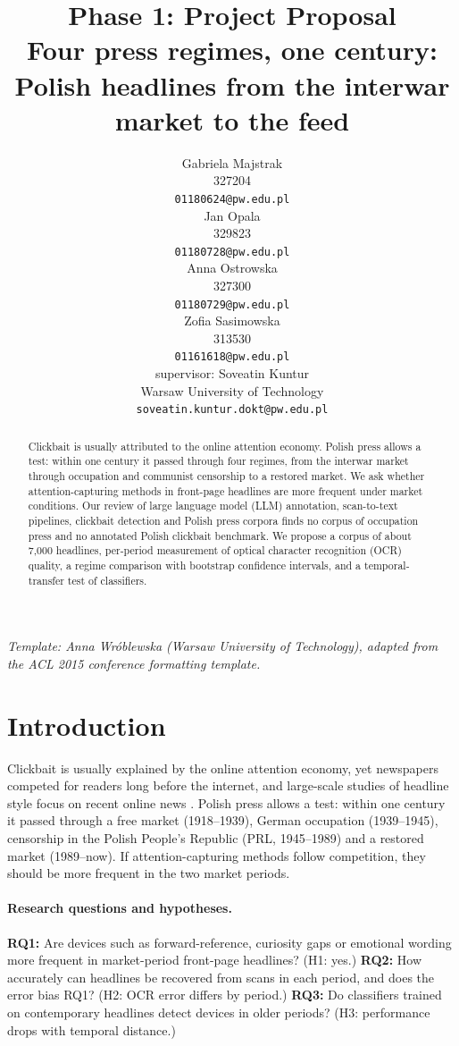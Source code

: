\documentclass[11pt]{article}
\title{Phase 1: Project Proposal\\Four press regimes, one century: Polish headlines from the interwar market to the feed}
\author{Gabriela Majstrak \\
  327204 \\
  {\tt 01180624@pw.edu.pl} \\\And
  Jan Opala \\
  329823 \\
  {\tt 01180728@pw.edu.pl} \\ \AND
  Anna Ostrowska \\
  327300 \\
  {\tt 01180729@pw.edu.pl} \\\And
  Zofia Sasimowska \\
  313530 \\
  {\tt 01161618@pw.edu.pl} \\ \AND
  supervisor: Soveatin Kuntur\\
  Warsaw University of Technology \\
  {\tt soveatin.kuntur.dokt@pw.edu.pl}}
\date{}
\begin{document}
\maketitle

{\small\em Template: Anna Wróblewska (Warsaw University of Technology), adapted from the ACL 2015 conference formatting template.}
\vspace{4pt}

\begin{abstract}
Clickbait is usually attributed to the online attention economy. Polish press allows a test: within one century it passed through four regimes, from the interwar market through occupation and communist censorship to a restored market. We ask whether attention-capturing methods in front-page headlines are more frequent under market conditions. Our review of large language model (LLM) annotation, scan-to-text pipelines, clickbait detection and Polish press corpora finds no corpus of occupation press and no annotated Polish clickbait benchmark. We propose a corpus of about 7,000 headlines, per-period measurement of optical character recognition (OCR) quality, a regime comparison with bootstrap confidence intervals, and a temporal-transfer test of classifiers.
\end{abstract}

\section{Introduction}
Clickbait is usually explained by the online attention economy, yet newspapers competed for readers long before the internet, and large-scale studies of headline style focus on recent online news \cite{nickl2025evolution,blom2015clickbait}. Polish press allows a test: within one century it passed through a free market (1918--1939), German occupation (1939--1945), censorship in the Polish People's Republic (PRL, 1945--1989) and a restored market (1989--now). If attention-capturing methods follow competition, they should be more frequent in the two market periods.

\paragraph{Research questions and hypotheses.}
\textbf{RQ1:} Are devices such as forward-reference, curiosity gaps or emotional wording more frequent in market-period front-page headlines? (H1: yes.)
\textbf{RQ2:} How accurately can headlines be recovered from scans in each period, and does the error bias RQ1? (H2: OCR error differs by period.)
\textbf{RQ3:} Do classifiers trained on contemporary headlines detect devices in older periods? (H3: performance drops with temporal distance.)
\end{document}

